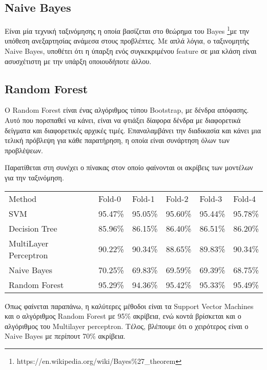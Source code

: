 \subsection{Naive Bayes}

Είναι μία τεχνική ταξινόμησης η οποία βασίζεται στο θεώρημα του Bayes \footnote{https://en.wikipedia.org/wiki/Bayes\%27\_theorem}με την υπόθεση ανεξαρτησίας ανάμεσα στους προβλέπτες. Με απλά λόγια, ο ταξινομητής Naive Bayes, υποθέτει ότι η ύπαρξη ενός συγκεκριμένου feature σε μια κλάση είναι ασυσχέτιστη με την υπάρξη οποιουδήποτε άλλου. 

\subsection{Random Forest}

O Random Forest είναι ένας αλγόριθμος τύπου Bootstrap, με δένδρα απόφασης. Αυτό που πορσπαθεί να κάνει, είναι να φτιάξει δίαφορα δένδρα με διαφορετικά δείγματα και διαφορετικές αρχικές τιμές. Επαναλαμβάνει την διαδικασία και κάνει μια τελική πρόβλεψη για κάθε παρατήρηση, η οποία είναι συνάρτηση όλων των προβλέψεων.

\hfill

Παρατίθεται στη συνέχει ο πίνακας στον οποίο φαίνονται οι ακρίβεις των μοντέλων για την ταξινόμηση.


\begin{table}[h]
\begin{tabular}{llllll}
Method                & Fold-0   & Fold-1   & Fold-2   & Fold-3   & Fold-4  \\
SVM                   & 95.47\%  & 95.05\%  & 95.60\%  & 95.44\%  & 95.78\% \\
Decision Tree         & 85.96\%  & 86.15\%  & 86.40\%  & 86.51\%  & 86.20\% \\
MultiLayer Perceptron & 90.22\%  & 90.34\%  & 88.65\%  & 89.83\%  & 90.34\% \\
Naive Bayes           & 70.25\%  & 69.83\%  & 69.59\%  & 69.39\%  & 68.75\% \\
Random Forest         & 95.29\%  & 94.36\%  & 95.42\%  & 95.33\%  & 95.49\%
\end{tabular}
\end{table}

Όπως φαίνεται παραπάνω, η καλύτερες μέθοδοι είναι τα Support Vector Machines και ο αλγόριθμος Random Forest με 95\% ακρίβεια, ενώ  κοντά βρίσκεται και ο αλγόριθμος του Multilayer perceptron. Τέλος, βλέπουμε ότι ο χειρότερος είναι ο Naive Bayes με περίπουτ 70\% ακρίβεια.
